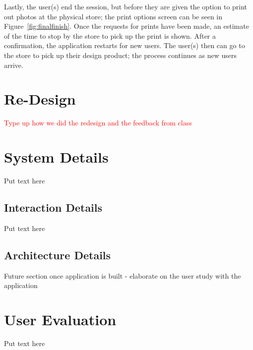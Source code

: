 \documentclass{tei2013}
\begin{document}
Lastly, the user(s) end the session, but before they are given the option to print out photos at the physical store; the print options screen can be seen in Figure~\ref{fig:finalfinish}. Once the requests for prints have been made, an estimate of the time to stop by the store to pick up the print is shown. After a confirmation, the application restarts for new users. The user(s) then can go to the store to pick up their design product; the process continues as new users arrive.

\section{Re-Design}
\textcolor{red}{Type up how we did the redesign and the feedback from class}

\section{System Details}
Put text here
\subsection{Interaction Details}
Put text here
\subsection{Architecture Details}
Future section once application is built - elaborate on the user study with the application

\section{User Evaluation}
Put text here
\end{document}
